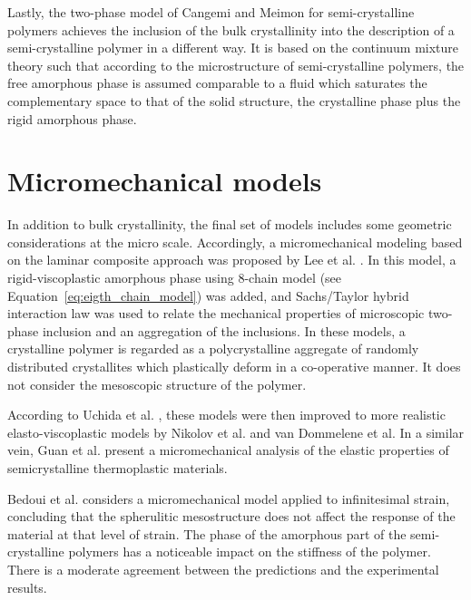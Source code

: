 Lastly, the two-phase model of Cangemi and Meimon for semi-crystalline polymers \citep{cangemiTwoPhaseModelMechanical2001} achieves the inclusion of the bulk crystallinity into the description of a semi-crystalline polymer in a different way.
It is based on the continuum mixture theory such that according to the microstructure of semi-crystalline polymers, the free amorphous phase is assumed comparable to a fluid which saturates the complementary space to that of the solid structure, the crystalline phase plus the rigid amorphous phase.

\section{Micromechanical models}

In addition to bulk crystallinity, the final set of models includes some geometric considerations at the micro scale.
Accordingly, a micromechanical modeling based on the laminar composite approach was proposed by Lee et al. \citep{leeMicromechanicalModelingLarge1993, leeSimulationLargeStrain1993}.
In this model, a rigid-viscoplastic amorphous phase using 8-chain model (see Equation~\eqref{eq:eigth_chain_model}) was added, and Sachs/Taylor hybrid interaction law was used to relate the mechanical properties of microscopic two-phase inclusion and an aggregation of the inclusions.
In these models, a crystalline polymer is regarded as a polycrystalline aggregate of randomly distributed crystallites which plastically deform in a co-operative manner.
It does not consider the mesoscopic structure of the polymer.

According to Uchida et al. \citep{uchidaMicroMesoMacroscopic2013}, these models were then improved to more realistic elasto-viscoplastic models by Nikolov et al. \citep{nikolovMicroMacroConstitutive2000, nikolovMultiscaleConstitutiveModeling2002} and van Dommelene et al. \citep{vandommelenMicromechanicalModelingElastoviscoplastic2003}
In a similar vein, Guan et al. \citep{guanMicromechanicalModelElastic2004} present a micromechanical analysis of the elastic properties of semicrystalline thermoplastic materials.

Bedoui et al. \citep{bedouiMicromechanicalModelingIsotropic2006} considers a micromechanical model applied to infinitesimal strain, concluding that the spherulitic mesostructure does not affect the response of the material at that level of strain.
The phase of the amorphous part of the semi-crystalline polymers has a noticeable impact on the stiffness of the polymer.
There is a moderate agreement between the predictions and the experimental results.

